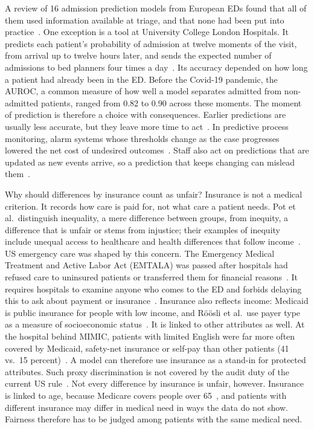 A review of 16 admission prediction models from European EDs found that all of them used information available at triage, and that none had been put into practice~\cite{brink2022predicting}. One exception is a tool at University College London Hospitals. It predicts each patient's probability of admission at twelve moments of the visit, from arrival up to twelve hours later, and sends the expected number of admissions to bed planners four times a day~\cite{king2022machine}. Its accuracy depended on how long a patient had already been in the ED. Before the Covid-19 pandemic, the AUROC, a common measure of how well a model separates admitted from non-admitted patients, ranged from 0.82 to 0.90 across these moments. The moment of prediction is therefore a choice with consequences. Earlier predictions are usually less accurate, but they leave more time to act~\cite{metzger2023automatically}. In predictive process monitoring, alarm systems whose thresholds change as the case progresses lowered the net cost of undesired outcomes~\cite{fahrenkrogpetersen2022fire}. Staff also act on predictions that are updated as new events arrive, so a prediction that keeps changing can mislead them~\cite{teinemaa2018temporal}.

Why should differences by insurance count as unfair? Insurance is not a medical criterion. It records how care is paid for, not what care a patient needs. Pot et al.\ distinguish inequality, a mere difference between groups, from inequity, a difference that is unfair or stems from injustice; their examples of inequity include unequal access to healthcare and health differences that follow income~\cite{pot2021not}. US emergency care was shaped by this concern. The Emergency Medical Treatment and Active Labor Act (EMTALA) was passed after hospitals had refused care to uninsured patients or transferred them for financial reasons~\cite{venkatesh2019association}. It requires hospitals to examine anyone who comes to the ED and forbids delaying this to ask about payment or insurance~\cite{emtala}. Insurance also reflects income: Medicaid is public insurance for people with low income, and R\"o\"osli et al.\ use payer type as a measure of socioeconomic status~\cite{roosli2022peeking}. It is linked to other attributes as well. At the hospital behind MIMIC, patients with limited English were far more often covered by Medicaid, safety-net insurance or self-pay than other patients (41 vs.\ 15 percent)~\cite{schulson2018emergency}. A model can therefore use insurance as a stand-in for protected attributes. Such proxy discrimination is not covered by the audit duty of the current US rule~\cite{lacava2026future}. Not every difference by insurance is unfair, however. Insurance is linked to age, because Medicare covers people over 65~\cite{roosli2022peeking}, and patients with different insurance may differ in medical need in ways the data do not show. Fairness therefore has to be judged among patients with the same medical need.

